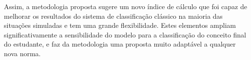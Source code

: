 \documentclass{article}
\begin{document}
Assim, a metodologia proposta sugere um novo índice de
cálculo que foi capaz de melhorar os resultados do sistema
de classificação clássico na maioria das situações
simuladas e tem uma grande flexibilidade. Estes elementos
ampliam significativamente a sensibilidade do modelo para
a classificação do conceito final do estudante, e faz da
metodologia uma proposta muito adaptável a qualquer nova norma.





\end{document}
